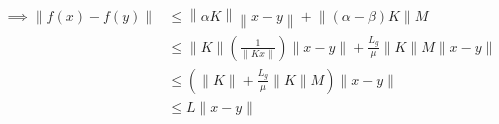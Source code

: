 \begin{align*}
    \implies
    \|f(x)-f(y)\|
     & \leq
    \left \|
    \alpha K
    \right \|
    \left \|
    x - y
    \right \|
    +
    \left \|
    (\alpha - \beta) K
    \right \|
    M
    \\ & \leq
    \|K\| \left( \frac{1}{\|K x\|} \right) \|x - y\| + \frac{L_{g}}{\mu} \|K\| M \|x - y\|
    \\ & \leq
    \left( \|K\| + \frac{L_{g}}{\mu} \|K\| M \right) \|x - y\|
    \\ & \leq
    L \|x - y\|
\end{align*}
